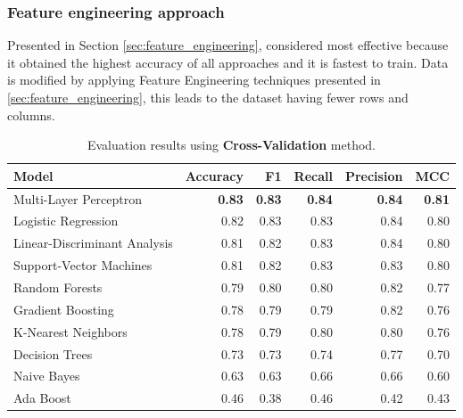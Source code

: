             \subsubsection{Feature engineering approach}
                
                Presented in Section \ref{sec:feature_engineering}, considered most effective because it obtained the highest accuracy of all approaches and it is fastest to train. Data is modified by applying Feature Engineering techniques presented in \ref{sec:feature_engineering}, this leads to the dataset having fewer rows and columns.
            
            \begin{table}[htbp]
                \centering
                \begin{tabular}{lrrrrr}
                    \toprule
                    \textbf{Model} & \textbf{Accuracy} & \textbf{F1} & \textbf{Recall} & \textbf{Precision} & \textbf{MCC} \\
                    \midrule
                    Multi-Layer Perceptron & \textbf{0.83} & \textbf{0.83} & \textbf{0.84} & \textbf{0.84} & \textbf{0.81} \\
                    Logistic Regression & 0.82 & 0.83 & 0.83 & 0.84 & 0.80 \\
                    Linear-Discriminant Analysis & 0.81 & 0.82 & 0.83 & 0.84 & 0.80 \\
                    Support-Vector Machines & 0.81 & 0.82 & 0.83 & 0.83 & 0.80 \\
                    Random Forests & 0.79 & 0.80 & 0.80 & 0.82 & 0.77 \\
                    Gradient Boosting & 0.78 & 0.79 & 0.79 & 0.82 & 0.76 \\
                    K-Nearest Neighbors & 0.78 & 0.79 & 0.80 & 0.80 & 0.76 \\
                    Decision Trees & 0.73 & 0.73 & 0.74 & 0.77 & 0.70 \\
                    Naive Bayes & 0.63 & 0.63 & 0.66 & 0.66 & 0.60 \\
                    Ada Boost & 0.46 & 0.38 & 0.46 & 0.42 & 0.43 \\
                    \bottomrule
                \end{tabular}
                \caption{Evaluation results using \textbf{Cross-Validation} method.}
                \label{tab:feature_engineering_approach_cv}
            \end{table}

